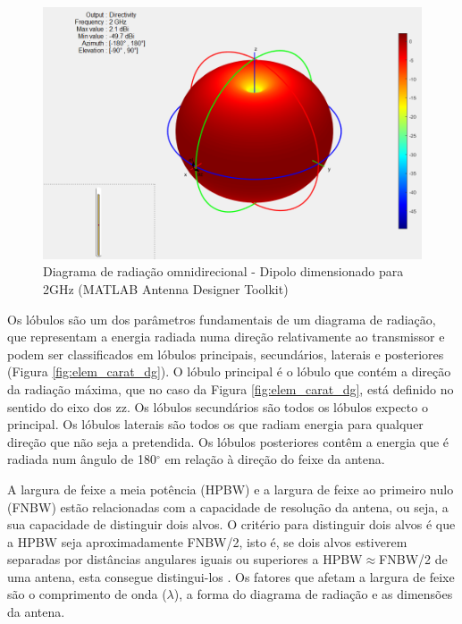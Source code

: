 \begin{figure}[h]
\centering
\includegraphics[scale=0.6]{chapters/ch3/assets/matlab_ad2}
\decoRule
\caption[Diagrama de radiação omnidirecional]{Diagrama de radiação omnidirecional - Dipolo dimensionado para 2GHz (MATLAB Antenna Designer Toolkit)}
\label{fig:omnidirecional}
\end{figure}

Os lóbulos são um dos parâmetros fundamentais de um diagrama de radiação, que representam a energia radiada numa direção relativamente ao transmissor e podem ser classificados em lóbulos principais, secundários, laterais e posteriores (Figura \ref{fig:elem_carat_dg}). O lóbulo principal é o lóbulo que contém a direção da radiação máxima, que no caso da Figura \ref{fig:elem_carat_dg}, está definido no sentido do eixo dos zz. Os lóbulos secundários são todos os lóbulos expecto o principal. Os lóbulos laterais são todos os que radiam energia para qualquer direção que não seja a pretendida. Os lóbulos posteriores contêm a energia que é radiada num ângulo de 180$^{\circ}$ em relação à direção do feixe da antena. \par 

A largura de feixe a meia potência (\gls{HPBW}) e a largura de feixe ao primeiro nulo (\gls{FNBW}) estão relacionadas com a capacidade de resolução da antena, ou seja, a sua capacidade de distinguir dois alvos. O critério para distinguir dois alvos é que a \gls{HPBW} seja aproximadamente \gls{FNBW}/2, isto é, se dois alvos estiverem separadas por distâncias angulares iguais ou superiores a \gls{HPBW}$\approx$\gls{FNBW}/2 de uma antena, esta consegue distingui-los \parencite{Kraus1988}. Os fatores que afetam a largura de feixe são o comprimento de onda ($\lambda$), a forma do diagrama de radiação e as dimensões da antena. \par 

